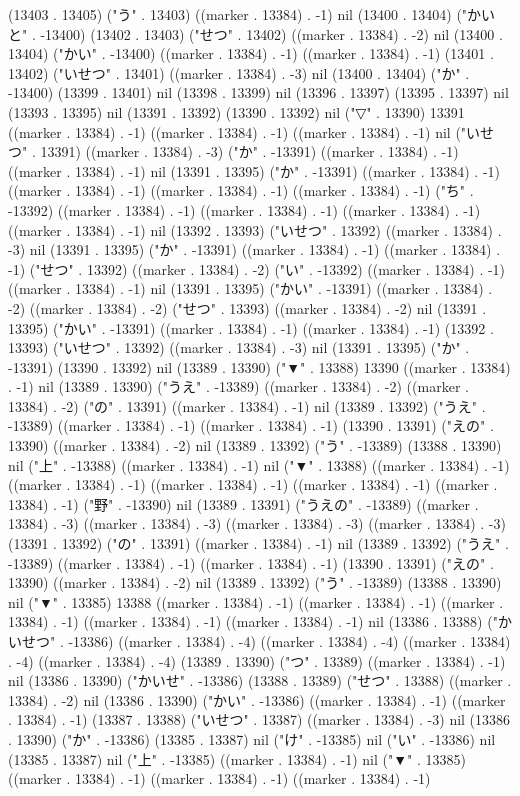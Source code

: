 (13403 . 13405) ("う" . 13403) ((marker . 13384) . -1) nil (13400 . 13404) ("かいと" . -13400) (13402 . 13403) ("せつ" . 13402) ((marker . 13384) . -2) nil (13400 . 13404) ("かい" . -13400) ((marker . 13384) . -1) ((marker . 13384) . -1) (13401 . 13402) ("いせつ" . 13401) ((marker . 13384) . -3) nil (13400 . 13404) ("か" . -13400) (13399 . 13401) nil (13398 . 13399) nil (13396 . 13397) (13395 . 13397) nil (13393 . 13395) nil (13391 . 13392) (13390 . 13392) nil ("▽" . 13390) 13391 ((marker . 13384) . -1) ((marker . 13384) . -1) ((marker . 13384) . -1) nil ("いせつ" . 13391) ((marker . 13384) . -3) ("か" . -13391) ((marker . 13384) . -1) ((marker . 13384) . -1) nil (13391 . 13395) ("か" . -13391) ((marker . 13384) . -1) ((marker . 13384) . -1) ((marker . 13384) . -1) ((marker . 13384) . -1) ("ち" . -13392) ((marker . 13384) . -1) ((marker . 13384) . -1) ((marker . 13384) . -1) ((marker . 13384) . -1) nil (13392 . 13393) ("いせつ" . 13392) ((marker . 13384) . -3) nil (13391 . 13395) ("か" . -13391) ((marker . 13384) . -1) ((marker . 13384) . -1) ("せつ" . 13392) ((marker . 13384) . -2) ("い" . -13392) ((marker . 13384) . -1) ((marker . 13384) . -1) nil (13391 . 13395) ("かい" . -13391) ((marker . 13384) . -2) ((marker . 13384) . -2) ("せつ" . 13393) ((marker . 13384) . -2) nil (13391 . 13395) ("かい" . -13391) ((marker . 13384) . -1) ((marker . 13384) . -1) (13392 . 13393) ("いせつ" . 13392) ((marker . 13384) . -3) nil (13391 . 13395) ("か" . -13391) (13390 . 13392) nil (13389 . 13390) ("▼" . 13388) 13390 ((marker . 13384) . -1) nil (13389 . 13390) ("うえ" . -13389) ((marker . 13384) . -2) ((marker . 13384) . -2) ("の" . 13391) ((marker . 13384) . -1) nil (13389 . 13392) ("うえ" . -13389) ((marker . 13384) . -1) ((marker . 13384) . -1) (13390 . 13391) ("えの" . 13390) ((marker . 13384) . -2) nil (13389 . 13392) ("う" . -13389) (13388 . 13390) nil ("上" . -13388) ((marker . 13384) . -1) nil ("▼" . 13388) ((marker . 13384) . -1) ((marker . 13384) . -1) ((marker . 13384) . -1) ((marker . 13384) . -1) ((marker . 13384) . -1) ("野" . -13390) nil (13389 . 13391) ("うえの" . -13389) ((marker . 13384) . -3) ((marker . 13384) . -3) ((marker . 13384) . -3) ((marker . 13384) . -3) (13391 . 13392) ("の" . 13391) ((marker . 13384) . -1) nil (13389 . 13392) ("うえ" . -13389) ((marker . 13384) . -1) ((marker . 13384) . -1) (13390 . 13391) ("えの" . 13390) ((marker . 13384) . -2) nil (13389 . 13392) ("う" . -13389) (13388 . 13390) nil ("▼" . 13385) 13388 ((marker . 13384) . -1) ((marker . 13384) . -1) ((marker . 13384) . -1) ((marker . 13384) . -1) ((marker . 13384) . -1) nil (13386 . 13388) ("かいせつ" . -13386) ((marker . 13384) . -4) ((marker . 13384) . -4) ((marker . 13384) . -4) ((marker . 13384) . -4) (13389 . 13390) ("つ" . 13389) ((marker . 13384) . -1) nil (13386 . 13390) ("かいせ" . -13386) (13388 . 13389) ("せつ" . 13388) ((marker . 13384) . -2) nil (13386 . 13390) ("かい" . -13386) ((marker . 13384) . -1) ((marker . 13384) . -1) (13387 . 13388) ("いせつ" . 13387) ((marker . 13384) . -3) nil (13386 . 13390) ("か" . -13386) (13385 . 13387) nil ("け" . -13385) nil ("い" . -13386) nil (13385 . 13387) nil ("上" . -13385) ((marker . 13384) . -1) nil ("▼" . 13385) ((marker . 13384) . -1) ((marker . 13384) . -1) ((marker . 13384) . -1) 
